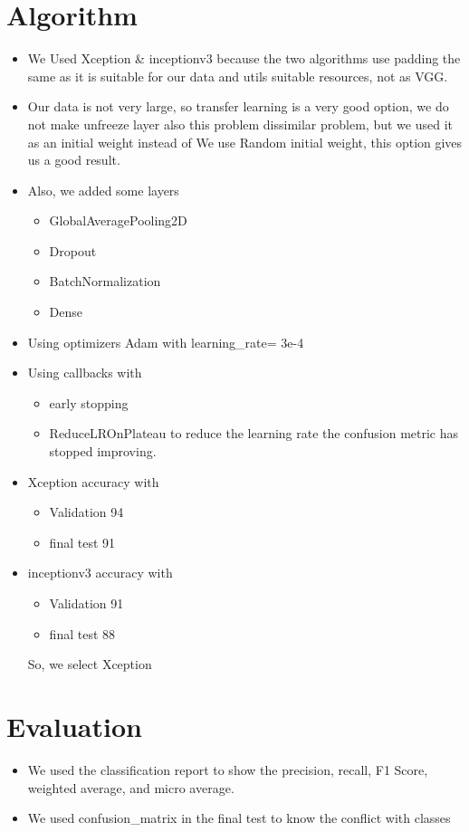 \documentclass{article}
\begin{document}
	\section* {Algorithm}
	\begin{itemize}
		\item We Used  Xception \&  inceptionv3  because the two algorithms use padding the same as it is suitable for our data and utils suitable resources, not as VGG.
		\item Our data is not very large, so transfer learning is a very good option, we do not make unfreeze layer also this problem dissimilar problem, but we used it as an initial weight instead of 
		We use Random initial weight, this option gives us a good result.
		\item Also, we added some layers
		\begin{itemize}
			\item GlobalAveragePooling2D
			\item Dropout
			\item BatchNormalization
			\item Dense
		\end{itemize}
		
		\item Using optimizers Adam with learning\_rate= 3e-4
		\item Using callbacks with 
		\begin{itemize}
			\item early stopping 
			\item ReduceLROnPlateau to reduce the learning rate the confusion metric has stopped improving. 

		\end{itemize}
		\item Xception accuracy with 
		\begin{itemize}
			\item Validation 94
			\item final test 91  
		\end{itemize}

		\item inceptionv3 accuracy with 
		\begin{itemize}
			\item Validation 91
			\item final test 88
		\end{itemize}
		So, we select Xception
	\end{itemize}
	\section*{Evaluation}
	\begin{itemize}
		\item We used the classification report to show the precision, recall, F1 Score, weighted average, and micro average.
		\item We used confusion\_matrix in the final test to know the conflict with classes
	\end{itemize}
	\pagebreak
	
\end{document}
